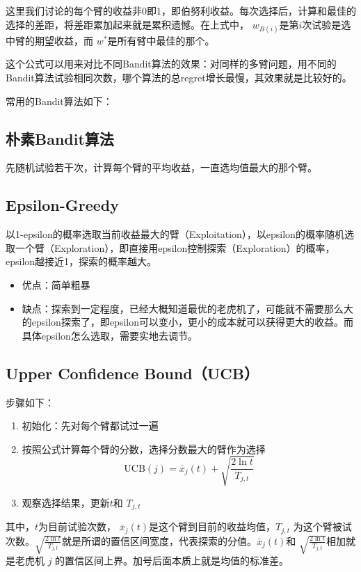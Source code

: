 \documentclass[12pt]{article}
\begin{document}
这里我们讨论的每个臂的收益非0即1，即伯努利收益。每次选择后，计算和最佳的选择的差距，将差距累加起来就是累积遗憾。在上式中， $w_{B(i)}$是第$i$次试验是选中臂的期望收益，而 $w^*$是所有臂中最佳的那个。

这个公式可以用来对比不同Bandit算法的效果：对同样的多臂问题，用不同的Bandit算法试验相同次数，哪个算法的总regret增长最慢，其效果就是比较好的。


常用的Bandit算法如下：

\subsection{朴素Bandit算法}
先随机试验若干次，计算每个臂的平均收益，一直选均值最大的那个臂。

\subsection{Epsilon-Greedy}
以1-epsilon的概率选取当前收益最大的臂（Exploitation），以epsilon的概率随机选取一个臂（Exploration），即直接用epsilon控制探索（Exploration）的概率，epsilon越接近1，探索的概率越大。
\begin{itemize}
\setlength{\itemsep}{0pt}
\setlength{\parsep}{0pt}
\setlength{\parskip}{0pt}
    \item 优点：简单粗暴
    \item 缺点：探索到一定程度，已经大概知道最优的老虎机了，可能就不需要那么大的epsilon探索了，即epsilon可以变小，更小的成本就可以获得更大的收益。而具体epsilon怎么选取，需要实地去调节。
\end{itemize}

\subsection{Upper Confidence Bound（UCB）}
步骤如下：
\begin{enumerate}
\setlength{\itemsep}{0pt}
\setlength{\parsep}{0pt}
\setlength{\parskip}{0pt}
    \item 初始化：先对每个臂都试过一遍
    \item 按照公式计算每个臂的分数，选择分数最大的臂作为选择
    $$
    	\text{UCB}(j) = \bar{x}_j(t) + \sqrt{\frac{2\ln{t}}{T_{j,t}}}
    $$
    \item 观察选择结果，更新$t$和 $T_{j,t}$
\end{enumerate}

其中，$t$为目前试验次数，  $\bar{x}_j(t)$是这个臂到目前的收益均值，$T_{j,t}$ 为这个臂被试次数。$\sqrt{\frac{2\ln{t}}{T_{j,t}}}$就是所谓的置信区间宽度，代表探索的分值。$\bar{x}_j(t) $和 $\sqrt{\frac{2\ln{t}}{T_{j,t}}}$相加就是老虎机 $j$ 的置信区间上界。加号后面本质上就是均值的标准差。
\end{document}
